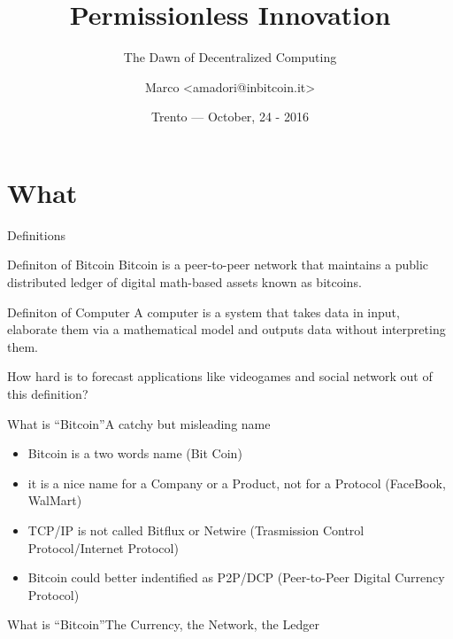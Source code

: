 \documentclass[english,compress]{beamer}
\title[Bitcoin Overview]{Permissionless Innovation}
\subtitle{The Dawn of Decentralized Computing}
\author[Marco Amadori]{Marco <amadori@inbitcoin.it>}
\institute{inbitcoin for Speck \& Tech --- \url{https://inbitcoin.it}}
\date{\scriptsize Trento --- \vspace{.10cm}October, 24 - 2016}
\begin{document}
\begin{frame}[plain]
  \titlepage
  \begin{center}%
    \hspace{1cm}%
    \end{center}%
\end{frame}


\section{What}

\begin{frame}[<+->]{Definitions}

\begin{exampleblock}{Definiton of Bitcoin}
Bitcoin is a peer-to-peer network
that maintains a public distributed ledger of 
digital math-based assets known as bitcoins.
\end{exampleblock}

\begin{exampleblock}{Definiton of Computer}
A computer is a system that takes data in input, elaborate them via a mathematical model and outputs data without interpreting them.
\end{exampleblock}

\onslide<+-> How hard is to forecast applications like videogames and social network out of this definition?


\end{frame}

\begin{frame}{What is ``Bitcoin''}{A catchy but misleading name}
\begin{itemize}
 \item Bitcoin is a two words name (Bit Coin)
 \item it is a nice name for a Company or a Product, not for a Protocol (FaceBook, WalMart)
 \item TCP/IP is not called Bitflux or Netwire (Trasmission Control Protocol/Internet Protocol)
 \item Bitcoin could better indentified as P2P/DCP (Peer-to-Peer Digital Currency Protocol)
\end{itemize}


\end{frame}

\begin{frame}{What is ``Bitcoin''}{The Currency, the Network, the Ledger}
\begin{center}
\end{center}
\end{frame}
\end{document}
